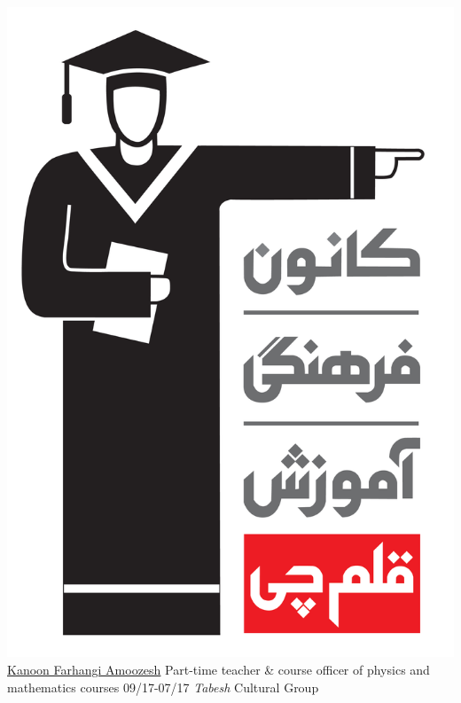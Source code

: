 \documentclass[a4paper]{friggeri-cv}
\begin{document}
\begin{entrylist}
        {\href{http://www.kanoon.ir/}{\includegraphics[scale=0.005]{../assets/images/logos/Kanoon_logo.png} Kanoon Farhangi Amoozesh}}
        {Part-time teacher \& course officer of physics and mathematics courses}
        \entry
        {09/17-07/17}
        {   \emph{Tabesh} Cultural Group}

\end{entrylist}
\end{document}
